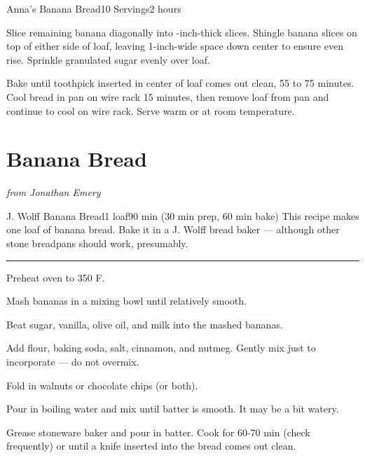 \documentclass[openany]{book}
\begin{document}
\begin{recipe}{Anna’s Banana Bread}{10 Servings}{2 hours}

Slice remaining banana diagonally into -inch-thick slices. Shingle banana slices on top of either side of loaf, leaving 1-inch-wide space down center to ensure even rise. Sprinkle granulated sugar evenly over loaf.

\newstep Bake until toothpick inserted in center of loaf comes out clean, 55 to 75 minutes. Cool bread in pan on wire rack 15 minutes, then remove loaf from pan and continue to cool on wire rack. Serve warm or at room temperature.

\end{recipe}

\chapter{Banana Bread}\label{banana-bread}

\emph{from Jonathan Emery}

\begin{recipe}[BananaBread]{J. Wolff Banana Bread}{1 loaf}{90 min (30 min prep, 60 min bake)}
\freeform This recipe makes one loaf of banana bread. Bake it in a J. Wolff bread baker --- although other stone breadpans should work, presumably.
\freeform\rule{\textwidth}{0.05pt}

\newstep Preheat oven to 350 \degrees F.

Mash bananas in a mixing bowl until relatively smooth.


Beat sugar, vanilla, olive oil, and milk into the mashed bananas.


Add flour, baking soda, salt, cinnamon, and nutmeg. Gently mix just to incorporate --- do not overmix.


Fold in walnuts or chocolate chips (or both).


Pour in boiling water and mix until batter is smooth. It may be a bit watery.

\newstep

Grease stoneware baker and pour in batter. Cook for 60-70 min (check frequently) or until a knife inserted into the bread comes out clean.
\end{recipe}
\end{document}
